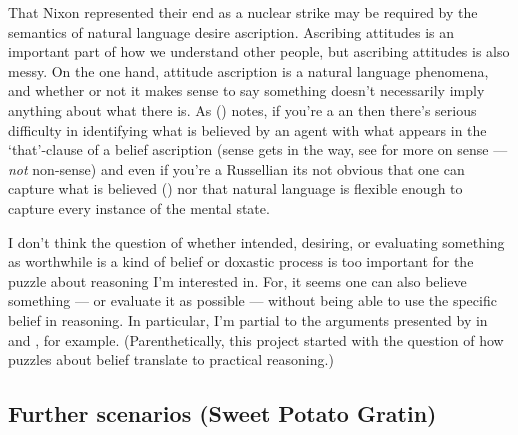 \documentclass[10pt]{article}
\newcommand{\hozline}[0]{%
  \noindent\hdashrule[0.5ex][c]{\textwidth}{.1pt}{}
}
\begin{document}
That Nixon represented their end as a nuclear strike may be required by the semantics of natural language desire ascription.
Ascribing attitudes is an important part of how we understand other people, but ascribing attitudes is also messy.
On the one hand, attitude ascription is a natural language phenomena, and whether or not it makes sense to say something doesn't necessarily imply anything about what there is.
As \citeauthor{Richard:1990aa} (\citeyear[78--85]{Richard:1990aa}) notes, if you're a \citeauthor{Frege:1948aa}an then there's serious difficulty in identifying what is believed by an agent with what appears in the `that'-clause of a belief ascription (sense gets in the way, see \textcite{May:2006aa} for more on sense --- \emph{not} non-sense) and even if you're a Russellian its not obvious that one can capture what is believed (\cite[cf.][]{Humberstone:2013aa}) nor that natural language is flexible enough to capture every instance of the mental state.

I don't think the question of whether intended, desiring, or evaluating something as worthwhile is a kind of belief or doxastic process is too important for the puzzle about reasoning I'm interested in.
For, it seems one can also believe something --- or evaluate it as possible --- without being able to use the specific belief in reasoning.
In particular, I'm partial to the arguments presented by \citeauthor{Perry:1986aa} in  and , for example.
(Parenthetically, this project started with the question of how puzzles about belief translate to practical reasoning.)
\hozline

\newpage

\subsection*{Further scenarios \hfill (Sweet Potato Gratin)}
\label{sec:further-scenarios}

\hozline
\end{document}
